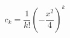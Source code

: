 \documentclass[12pt]{article}
\begin{document}
\begin{displaymath}
c_k = \frac{1}{k!}\left(-\frac{x^2}{4}\right)^k
\end{displaymath}
\end{document}
